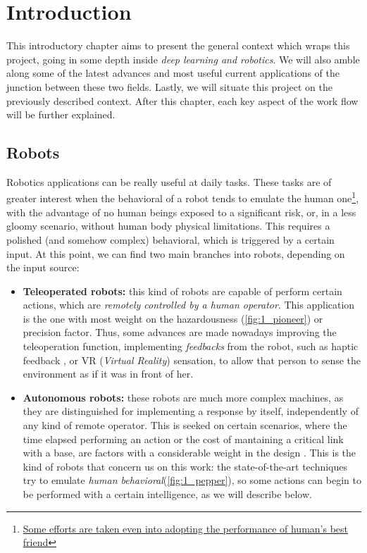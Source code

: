 \chapter{Introduction}

This introductory chapter aims to present the general context which wraps this project, going in some depth inside \textit{deep learning and robotics}. We will also amble along some of the latest advances and most useful current applications of the junction between these two fields. Lastly, we will situate this project on the previously described context. After this chapter, each key aspect of the work flow will be further explained.\\

\section{Robots}

Robotics applications can be really useful at daily tasks. These tasks are of greater interest when the behavioral of a robot tends to emulate the human one\footnote{\href{https://www.engadget.com/2018/01/08/new-sony-aibo-first-impressions/}{Some efforts are taken even into adopting the performance of human's best friend}}, with the advantage of no human beings exposed to a significant risk, or, in a less gloomy scenario, without human body physical limitations. This requires a polished (and somehow complex) behavioral, which is triggered by a certain input. At this point, we can find two main branches into robots, depending on the input source:
\begin{itemize}
	\item \textbf{Teleoperated robots:} this kind of robots are capable of perform certain actions, which are \textit{remotely controlled by a human operator}. This application is the one with most weight on the hazardousness (\autoref{fig:1_pioneer}) \cite{chernobyl-robot} or precision \cite{teleop-surgery} factor. Thus, some advances are made nowadays improving the teleoperation function, implementing \emph{feedbacks} from the robot, such as haptic feedback \cite{teleop-haptic}, or VR (\emph{Virtual Reality}) sensation, to allow that person to sense the environment as if it was in front of her.	
	
	\item \textbf{Autonomous robots:} these robots are much more complex machines, as they are distinguished for implementing a response by itself, independently of any kind of remote operator. This is seeked on certain scenarios, where the time elapsed performing an action or the cost of mantaining a critical link with a base, are factors with a considerable weight in the design \cite{ai-space}. This is the kind of robots that concern us on this work: the state-of-the-art techniques try to emulate \emph{human behavioral}(\autoref{fig:1_pepper}), so some actions can begin to be performed with a certain intelligence, as we will describe below.
\end{itemize}


